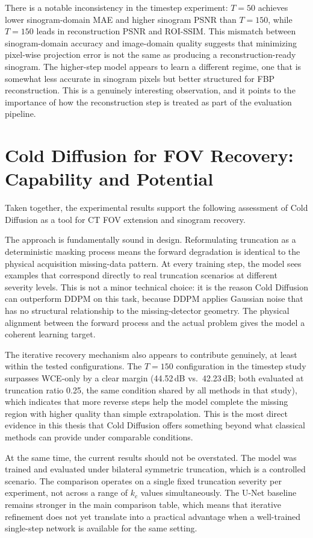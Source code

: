 There is a notable inconsistency in the timestep experiment: \(T = 50\) achieves lower sinogram-domain MAE and higher sinogram PSNR than \(T = 150\), while \(T = 150\) leads in reconstruction PSNR and ROI-SSIM. This mismatch between sinogram-domain accuracy and image-domain quality suggests that minimizing pixel-wise projection error is not the same as producing a reconstruction-ready sinogram. The higher-step model appears to learn a different regime, one that is somewhat less accurate in sinogram pixels but better structured for FBP reconstruction. This is a genuinely interesting observation, and it points to the importance of how the reconstruction step is treated as part of the evaluation pipeline.

\section{Cold Diffusion for FOV Recovery: Capability and Potential}

Taken together, the experimental results support the following assessment of Cold Diffusion as a tool for CT FOV extension and sinogram recovery.

The approach is fundamentally sound in design. Reformulating truncation as a deterministic masking process means the forward degradation is identical to the physical acquisition missing-data pattern. At every training step, the model sees examples that correspond directly to real truncation scenarios at different severity levels. This is not a minor technical choice: it is the reason Cold Diffusion can outperform DDPM on this task, because DDPM applies Gaussian noise that has no structural relationship to the missing-detector geometry. The physical alignment between the forward process and the actual problem gives the model a coherent learning target.

The iterative recovery mechanism also appears to contribute genuinely, at least within the tested configurations. The \(T = 150\) configuration in the timestep study surpasses WCE-only by a clear margin (44.52\,dB vs.\ 42.23\,dB; both evaluated at truncation ratio 0.25, the same condition shared by all methods in that study), which indicates that more reverse steps help the model complete the missing region with higher quality than simple extrapolation. This is the most direct evidence in this thesis that Cold Diffusion offers something beyond what classical methods can provide under comparable conditions.

At the same time, the current results should not be overstated. The model was trained and evaluated under bilateral symmetric truncation, which is a controlled scenario. The comparison operates on a single fixed truncation severity per experiment, not across a range of \(k_c\) values simultaneously. The U-Net baseline remains stronger in the main comparison table, which means that iterative refinement does not yet translate into a practical advantage when a well-trained single-step network is available for the same setting.

